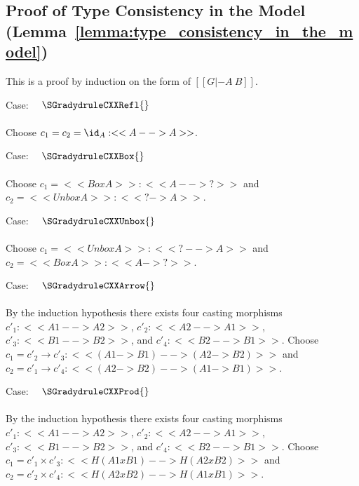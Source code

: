 \subsection{Proof of Type Consistency in the Model (Lemma~\ref{lemma:type_consistency_in_the_model})}
\label{subsec:proof_of_type_consistency_in_the_model}
This is a proof by induction on the form of $[[G |- A ~ B]]$.
\begin{description}
\item Case: $\quad \SGradydruleCXXRefl{}$\\
  \ \\
  \noindent  
  Choose $c_1 = c_2 = \id_A : <<A --> A>>$.
  \ \\
\item Case: $\quad \SGradydruleCXXBox{}$\\
  \ \\
  \noindent
  Choose $c_1 = <<Box A>> : <<A --> ?>>$ and $c_2 = <<Unbox A>> : <<? -> A>>$.
  \ \\
\item Case: $\quad \SGradydruleCXXUnbox{}$\\
  \ \\
  \noindent
  Choose $c_1 = <<Unbox A>> : <<? --> A>>$ and $c_2 = <<Box A>> : <<A -> ?>>$.
  \ \\
\item Case: $\quad \SGradydruleCXXArrow{}$\\
  \ \\
  \noindent  
  By the induction hypothesis there exists four casting morphisms
  $c'_1 : <<A1 --> A2>>$, $c'_2 : <<A2 --> A1>>$, $c'_3 : <<B1 --> B2>>$,
  and $c'_4 : <<B2 --> B1>>$.  Choose
  $c_1 = c'_2 \to c'_3 : <<(A1 -> B1) --> (A2 -> B2)>>$
  and
  $c_2 = c'_1 \to c'_4 : <<(A2 -> B2) --> (A1 -> B1)>>$.
  \ \\
\item Case: $\quad \SGradydruleCXXProd{}$\\
  \ \\
  \noindent  
  By the induction hypothesis there exists four casting morphisms
  $c'_1 : <<A1 --> A2>>$, $c'_2 : <<A2 --> A1>>$, $c'_3 : <<B1 --> B2>>$,
  and $c'_4 : <<B2 --> B1>>$.
  Choose
  $c_1 = c'_1 \times c'_3 : <<H(A1 x B1) --> H(A2 x B2)>>$
  and
  $c_2 = c'_2 \times c'_4 : <<H(A2 x B2) --> H(A1 x B1)>>$.
\end{description}

